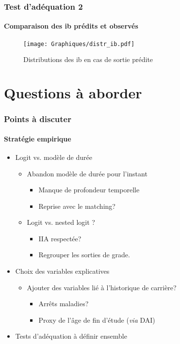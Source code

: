 \documentclass[xcolor=table,ignorenonframetext,12pt]{beamer}
\newenvironment{choixmarges}[2]{\begin{list}{}{%
\setlength{\topsep}{0pt}%
\setlength{\leftmargin}{0pt}%
\setlength{\rightmargin}{0pt}%
\setlength{\listparindent}{\parindent}%
\setlength{\itemindent}{\parindent}%
\setlength{\parsep}{0pt plus 1pt}%
\addtolength{\leftmargin}{#1}%
\addtolength{\rightmargin}{#2}%
}\item }{\end{list}}
\begin{document}
\begin{frame}
\frametitle{Test d'adéquation 2}
\framesubtitle{Comparaison des ib prédits et observés}

\begin{figure}
	\caption{Distributions des ib en cas de sortie prédite}
		\vspace{-0.3cm}
	\texttt{[image: Graphiques/distr\_ib.pdf]}
\end{figure}

\end{frame}


\section{Questions à aborder}





\begin{frame}
\frametitle{Points à discuter}
\framesubtitle{Stratégie empirique}

\begin{choixmarges}{-0.5cm}{-0.5cm}


\begin{itemize}


\item Logit vs. modèle de durée
	\begin{itemize}
	\item Abandon modèle de durée pour l'instant
	\begin{itemize}
	\item Manque de profondeur temporelle
	\item Reprise avec le matching?
	\end{itemize}
	
	\item Logit vs. nested logit ?
	\begin{itemize}
	\item IIA respectée? 
	\item Regrouper les sorties de grade.
	\end{itemize}
	\end{itemize}

\vspace{0.2cm}
\item Choix des variables explicatives
	\begin{itemize}
	\item Ajouter des variables lié à l'historique de carrière? 
	\begin{itemize}
	\item Arrêts maladies? 
	\item Proxy de l'âge de fin d'étude (\textit{via} DAI)
	\end{itemize}
	\end{itemize}

\vspace{0.2cm}
\item Tests d'adéquation à définir ensemble

\end{itemize}


\end{choixmarges}
\end{frame}
\end{document}
